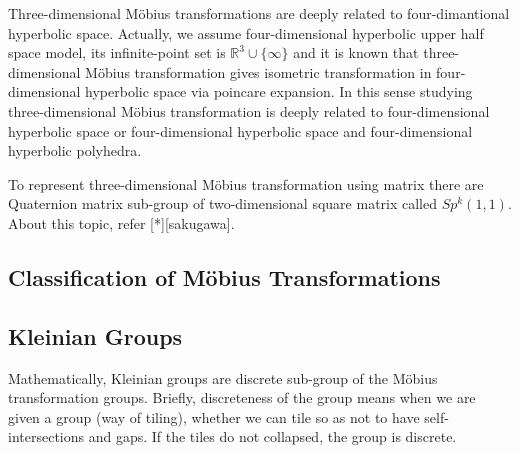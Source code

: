 Three-dimensional M\"obius transformations are deeply related to
four-dimantional hyperbolic space. Actually, we assume four-dimensional
hyperbolic upper half space model, its infinite-point set is 
$\mathbb{R}^3\cup\{\infty\}$ and it is known that three-dimensional M\"obius
transformation gives isometric transformation in four-dimensional
hyperbolic space via poincare expansion.
In this sense studying three-dimensional M\"obius transformation is
deeply related to four-dimensional hyperbolic space or four-dimensional
hyperbolic space and four-dimensional hyperbolic polyhedra.

To represent three-dimensional M\"obius transformation using matrix
there are Quaternion matrix sub-group of two-dimensional square matrix called 
$Sp^k(1,1)$. About this topic, refer [*][sakugawa].

\subsection{Classification of M\"obius Transformations}



\subsection{Kleinian Groups}

Mathematically, Kleinian groups are discrete sub-group of the M\"obius
transformation groups.  Briefly, discreteness of the group means when we
are given a group (way of tiling), whether we can tile so as not to have
self-intersections and gaps.  If the tiles do not collapsed, the group
is discrete.
